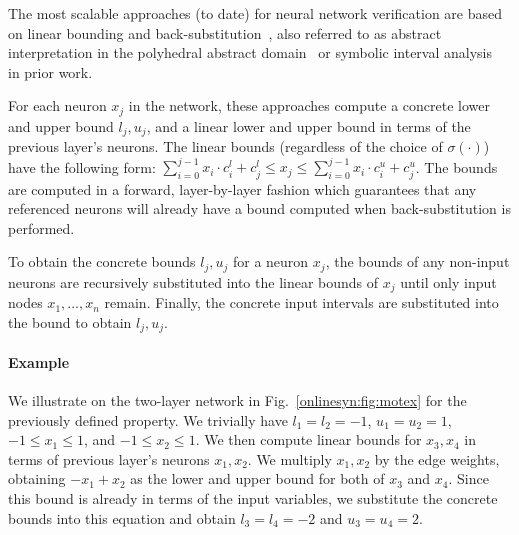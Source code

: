 The most scalable approaches (to date) for neural network verification are
based on linear bounding and back-substitution~\cite{autolipra}, also referred
to
as abstract interpretation in the polyhedral abstract domain~\cite{SinghGPV19} or symbolic
interval analysis~\cite{WangPWYJ18nips} in prior work.


For each
neuron $ x_j $ in the network, these approaches compute a concrete lower and
upper bound $ l_j, u_j $, and a linear lower and upper bound in terms of the
previous layer's neurons. The linear bounds (regardless of the choice of $
\sigma(\cdot) $) have the following form:
$ \sum_{i=0}^{j-1} x_i \cdot c^l_i + c^l_j \leq x_j \leq \sum_{i=0}^{j-1}
x_i \cdot c^u_i + c^u_j $. The bounds are computed in a forward, layer-by-layer
fashion which guarantees that any referenced neurons will already have a bound
computed when back-substitution is performed.


To obtain the concrete bounds $ l_j, u_j $ for a neuron $ x_j $, the bounds of
any non-input neurons are recursively substituted into the linear bounds of $
x_j $ until only input nodes $ x_1, ..., x_n $ remain. Finally, the concrete
input intervals are substituted into the bound to obtain $ l_j, u_j $.


\paragraph{Example}

We illustrate on the two-layer network in Fig.~\ref{onlinesyn:fig:motex} for the
previously defined property. We trivially have $ l_1 = l_2 = -1 $, $ u_1 = u_2
= 1 $, $ -1 \leq x_1 \leq 1 $, and $ -1 \leq x_2 \leq 1 $. We then compute
linear bounds for $ x_3, x_4 $ in terms of previous layer's neurons $ x_1, x_2
$.
We multiply $ x_1, x_2 $ by the edge weights, obtaining $ -x_1 + x_2 $ as the
lower and upper bound for both of $ x_3 $ and $ x_4 $.
Since this bound is already in terms of the input variables, we substitute the
concrete bounds into this equation and obtain $ l_3 = l_4 = -2 $ and $ u_3 =
u_4 = 2 $.

